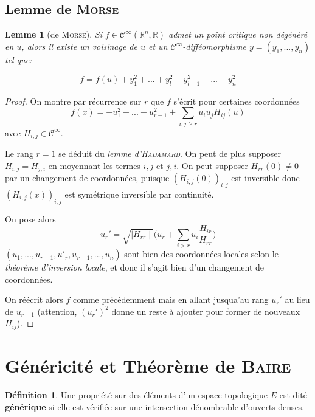 \documentclass[a4paper]{article}
\newcommand{\cinf}{\mathcal{C}^\infty}
\newcommand{\R}{\mathbb{R}}
\newtheorem{lemm}{Lemme}
\theoremstyle{definition}
\newtheorem{defn}{Définition}
\begin{document}
\subsection{Lemme de \textsc{Morse}}
\begin{lemm}[de \textsc{Morse}]
	Si $f\in\cinf(\R^n,\R)$ admet un point critique non dégénéré en $u$, alors il existe un voisinage de $u$ et un $\cinf$-difféomorphisme $y=(y_1,...,y_n)$ tel que:

	$$f=f(u)+y_1^2+...+y_l^2-y_{l+1}^2-...-y_n^2$$
\end{lemm}
\begin{proof}
	On montre par récurrence sur $r$ que $f$ s'écrit pour certaines coordonnées
	$$f(x)=\pm u_1^2 \pm...\pm u_{r-1}^2 + \sum_{i,j\geq r} u_iu_jH_{ij}(u)$$
	avec $H_{i,j}\in\cinf$.

	Le rang $r=1$ se déduit du \textit{lemme d'\textsc{Hadamard}}. On peut de plus supposer $H_{i,j}=H_{j,i}$ en moyennant les termes $i,j$ et $j,i$.
	On peut supposer $H_{rr}(0)\neq0$ par un changement de coordonnées, puisque $(H_{i,j}(0))_{i,j}$ est inversible donc $(H_{i,j}(x))_{i,j}$ est symétrique inversible par continuité.

	On pose alors $$u_r' =\sqrt{\mid H_{rr}\mid}\big(u_r+\sum_{i>r}u_i\frac{H_{ir}}{H_{rr}}\big)$$
	$(u_1,...,u_{r-1},u'_r,u_{r+1},...,u_n)$ sont bien des coordonnées locales selon le \textit{théorème d'inversion locale}, et donc il s'agit bien d'un changement de coordonnées.

	On réécrit alors $f$ comme précédemment mais en allant jusqua'au rang $u_r'$ au lieu de $u_{r-1}$ (attention, $(u_r')^2$ donne un reste à ajouter pour former de nouveaux $H_{ij}$).
\end{proof}

\section{Généricité et Théorème de \textsc{Baire}}
\begin{defn}
	Une propriété sur des éléments d'un espace topologique $E$ est dité \textbf{générique} si elle est vérifiée sur une intersection dénombrable d'ouverts denses.
\end{defn}
\end{document}
